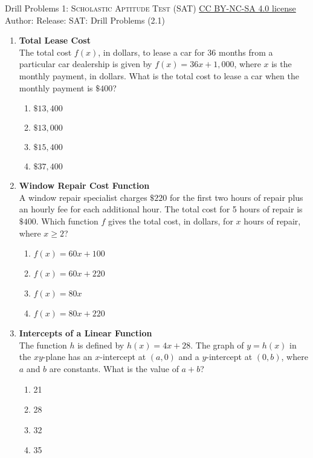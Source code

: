 \newpage\handout
{Drill Problems 1: }
{\textsc{Scholastic Aptitude Test (SAT)}}
{\href{https://creativecommons.org/licenses/by-nc-sa/4.0/}{CC BY-NC-SA 4.0 license}}
{Author: \BookAuthor}{Release: \generatedOn}
{SAT: Drill Problems (2.1)}











\begin{enumerate}

\item \textbf{Total Lease Cost}\\
The total cost $f(x)$, in dollars, to lease a car for 36 months from a particular car dealership is given by $f(x) = 36x + 1,000$, where $x$ is the monthly payment, in dollars. What is the total cost to lease a car when the monthly payment is $\$400$?
\begin{enumerate}[label=(\Alph*)]
  \item $\$13,400$
  \item $\$13,000$
  \item $\$15,400$
  \item $\$37,400$
\end{enumerate}
\begin{subanswer}
\end{subanswer}


\item \textbf{Window Repair Cost Function}\\
A window repair specialist charges $\$220$ for the first two hours of repair plus an hourly fee for each additional hour. The total cost for 5 hours of repair is $\$400$. Which function $f$ gives the total cost, in dollars, for $x$ hours of repair, where $x \geq 2$?
\begin{enumerate}[label=(\Alph*)]
  \item $f(x) = 60x + 100$
  \item $f(x) = 60x + 220$
  \item $f(x) = 80x$
  \item $f(x) = 80x + 220$
\end{enumerate}
\begin{subanswer}
\end{subanswer}

\item \textbf{Intercepts of a Linear Function}\\
The function $h$ is defined by $h(x) = 4x + 28$. The graph of $y = h(x)$ in the $xy$-plane has an $x$-intercept at $(a, 0)$ and a $y$-intercept at $(0, b)$, where $a$ and $b$ are constants. What is the value of $a + b$?
\begin{enumerate}[label=(\Alph*)]
  \item 21
  \item 28
  \item 32
  \item 35
\end{enumerate}
\begin{subanswer}
\end{subanswer}


\end{enumerate}
